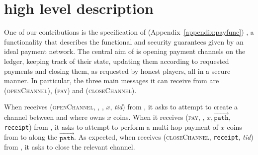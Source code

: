 \section{\fpaynet{} high level description}
  One of our contributions is the specification of \fpaynet
  (Appendix~\ref{appendix:payfunc}) , a functionality
  that describes the functional and security guarantees given by an ideal
  payment network. The central aim of \fpaynet{} is opening payment channels on
  the ledger, keeping track of their state, updating them according to requested
  payments and closing them, as requested by honest players, all in a secure
  manner. In particular, the three main messages it can receive from \alice{}
  are (\textsc{openChannel}), (\textsc{pay}) and (\textsc{closeChannel}).

  When \fpaynet{} receives (\textsc{openChannel}, \alice, \bob, $x$,
  \textit{tid}) from \alice, it asks \simulator{} to attempt to create a channel
  between \alice{} and \bob{} where \alice{} owns $x$ coins. When it receives
  (\textsc{pay}, \bob, $x, \overrightarrow{\mathtt{path}}$, \texttt{receipt})
  from \alice, it asks \simulator{} to attempt to perform a multi-hop payment of
  $x$ coins from \alice{} to \bob{} along the $\overrightarrow{\mathtt{path}}$.
  As expected, when \fpaynet{} receives (\textsc{closeChannel}, \texttt{receipt},
  \textit{tid}) from \alice, it asks \simulator{} to close the relevant channel.

